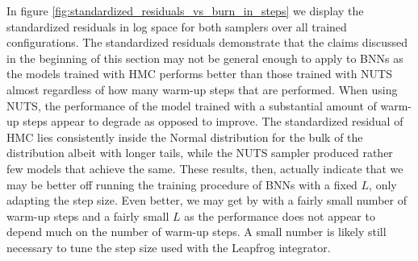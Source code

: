 In figure \ref{fig:standardized_residuals_vs_burn_in_steps} we display the standardized residuals in log space for both samplers over all trained configurations. 
The standardized residuals demonstrate that the claims discussed in the beginning of this section may not be general enough to apply to BNNs as the models trained with HMC performs better than those trained with NUTS almost regardless of how many warm-up steps that are performed. When using NUTS, the performance of the model trained with a substantial amount of warm-up steps appear to degrade as opposed to improve. The standardized residual of HMC lies consistently inside the Normal distribution for the bulk of the distribution albeit with longer tails, while the NUTS sampler produced rather few models that achieve the same. These results, then, actually indicate that we may be better off running the training procedure of BNNs with a fixed $L$, only adapting the step size. Even better, we may get by with a fairly small number of warm-up steps and a fairly small $L$ as the performance does not appear to depend much on the number of warm-up steps. A small number is likely still necessary to tune the step size used with the Leapfrog integrator. 
